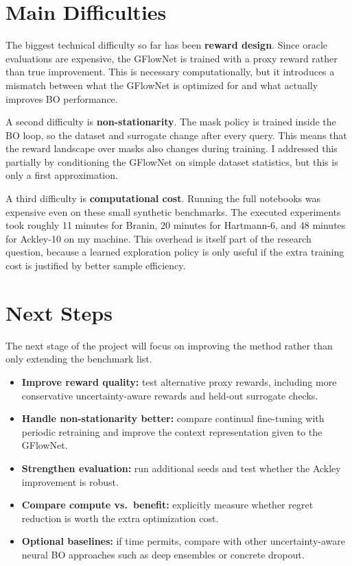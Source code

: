 \documentclass{article}
\begin{document}
\section{Main Difficulties}

The biggest technical difficulty so far has been \textbf{reward design}. Since oracle evaluations are expensive, the GFlowNet is trained with a proxy reward rather than true improvement. This is necessary computationally, but it introduces a mismatch between what the GFlowNet is optimized for and what actually improves BO performance.

A second difficulty is \textbf{non-stationarity}. The mask policy is trained inside the BO loop, so the dataset and surrogate change after every query. This means that the reward landscape over masks also changes during training. I addressed this partially by conditioning the GFlowNet on simple dataset statistics, but this is only a first approximation.

A third difficulty is \textbf{computational cost}. Running the full notebooks was expensive even on these small synthetic benchmarks. The executed experiments took roughly 11 minutes for Branin, 20 minutes for Hartmann-6, and 48 minutes for Ackley-10 on my machine. This overhead is itself part of the research question, because a learned exploration policy is only useful if the extra training cost is justified by better sample efficiency.

\section{Next Steps}

The next stage of the project will focus on improving the method rather than only extending the benchmark list.

\begin{itemize}
    \item \textbf{Improve reward quality:} test alternative proxy rewards, including more conservative uncertainty-aware rewards and held-out surrogate checks.
    \item \textbf{Handle non-stationarity better:} compare continual fine-tuning with periodic retraining and improve the context representation given to the GFlowNet.
    \item \textbf{Strengthen evaluation:} run additional seeds and test whether the Ackley improvement is robust.
    \item \textbf{Compare compute vs.\ benefit:} explicitly measure whether regret reduction is worth the extra optimization cost.
    \item \textbf{Optional baselines:} if time permits, compare with other uncertainty-aware neural BO approaches such as deep ensembles or concrete dropout.
\end{itemize}
\end{document}
